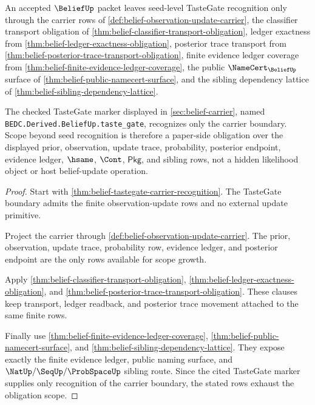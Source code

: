 \begin{theorem}
\label{thm:belief-tastegate-carrier-obligation-scope}
An accepted $\BeliefUp$ packet leaves seed-level TasteGate recognition only through the carrier rows of \autoref{def:belief-observation-update-carrier}, the classifier transport obligation of \autoref{thm:belief-classifier-transport-obligation}, ledger exactness from \autoref{thm:belief-ledger-exactness-obligation}, posterior trace transport from \autoref{thm:belief-posterior-trace-transport-obligation}, finite evidence ledger coverage from \autoref{thm:belief-finite-evidence-ledger-coverage}, the public $\NameCert_{\BeliefUp}$ surface of \autoref{thm:belief-public-namecert-surface}, and the sibling dependency lattice of \autoref{thm:belief-sibling-dependency-lattice}.

The checked TasteGate marker displayed in \autoref{sec:belief-carrier}, named \texttt{BEDC.Derived.BeliefUp.taste\_gate}, recognizes only the carrier boundary. Scope beyond seed recognition is therefore a paper-side obligation over the displayed prior, observation, update trace, probability, posterior endpoint, evidence ledger, $\hsame$, $\Cont$, $\mathsf{Pkg}$, and sibling rows, not a hidden likelihood object or host belief-update operation.
\end{theorem}
\begin{proof}
Start with \autoref{thm:belief-tastegate-carrier-recognition}. The TasteGate boundary admits the finite observation-update rows and no external update primitive.

Project the carrier through \autoref{def:belief-observation-update-carrier}. The prior, observation, update trace, probability row, evidence ledger, and posterior endpoint are the only rows available for scope growth.

Apply \autoref{thm:belief-classifier-transport-obligation}, \autoref{thm:belief-ledger-exactness-obligation}, and \autoref{thm:belief-posterior-trace-transport-obligation}. These clauses keep transport, ledger readback, and posterior trace movement attached to the same finite rows.

Finally use \autoref{thm:belief-finite-evidence-ledger-coverage}, \autoref{thm:belief-public-namecert-surface}, and \autoref{thm:belief-sibling-dependency-lattice}. They expose exactly the finite evidence ledger, public naming surface, and $\NatUp/\SeqUp/\ProbSpaceUp$ sibling route. Since the cited TasteGate marker supplies only recognition of the carrier boundary, the stated rows exhaust the obligation scope.
\end{proof}

